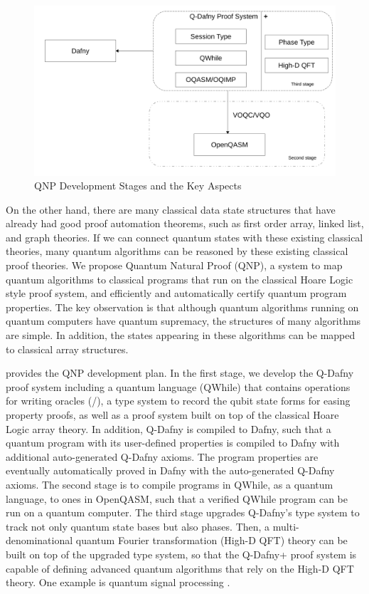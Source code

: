 \begin{figure}[t]
  \includegraphics[width=.75\textwidth]{stage}
  \caption{QNP Development Stages and the Key Aspects}
\label{fig:arch}
\end{figure}

On the other hand, there are many classical data state structures that have already had good proof automation theorems,
such as first order array, linked list, and graph theories. 
If we can connect quantum states with these existing classical theories, 
many quantum algorithms can be reasoned by these existing classical proof theories. 
We propose Quantum Natural Proof (QNP), a system to map quantum algorithms 
to classical programs that run on the classical Hoare Logic style proof system, 
and efficiently and automatically certify quantum program properties.
The key observation is that although quantum algorithms running on quantum computers have quantum supremacy,
the structures of many algorithms are simple. 
In addition, the states appearing in these algorithms can be mapped to classical array structures.

 provides the QNP development plan. 
In the first stage, we develop the Q-Dafny proof system including a quantum language (QWhile) 
that contains operations for writing oracles (\oqasm/\sourcelang),
a type system to record the qubit state forms for easing property proofs, 
as well as a proof system built on top of the classical Hoare Logic array theory.
In addition, Q-Dafny is compiled to Dafny, 
such that a quantum program with its user-defined properties is compiled to Dafny with additional auto-generated Q-Dafny axioms.
The program properties are eventually automatically proved in Dafny with the auto-generated Q-Dafny axioms.
The second stage is to compile programs in QWhile, as a quantum language, to ones in OpenQASM,
such that a verified QWhile program can be run on a quantum computer. 
The third stage upgrades Q-Dafny's type system to track not only quantum state bases but also phases.
Then, a multi-denominational quantum Fourier transformation (High-D QFT) theory can be built on top of the upgraded type system,
so that the Q-Dafny+ proof system is capable of defining advanced quantum algorithms that rely on the High-D QFT theory.
One example is quantum signal processing \cite{Low_2017}.

